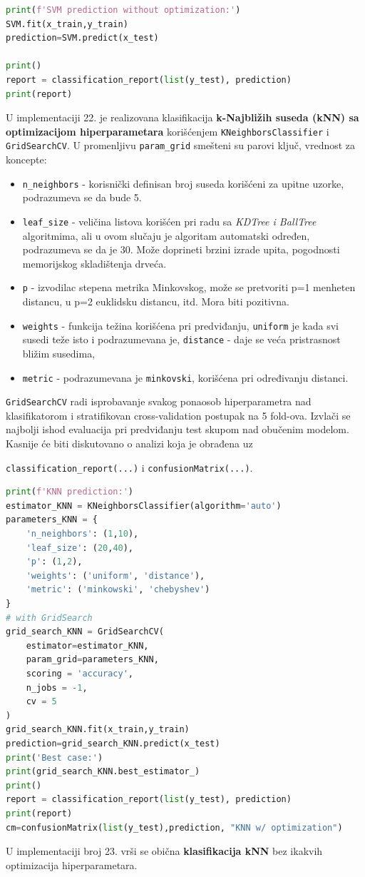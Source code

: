 \documentclass[fontsize=12bp, paper=a4]{scrarticle}
\begin{document}
\begin{lstlisting}[language=Python, caption=SVM bez ikakvih optimizacija hiperparametara.]
print(f'SVM prediction without optimization:')
SVM.fit(x_train,y_train)
prediction=SVM.predict(x_test)

print()
report = classification_report(list(y_test), prediction)
print(report)
\end{lstlisting}
U implementaciji 22. je realizovana klasifikacija \textbf{k-Najbližih suseda (kNN) sa optimizacijom hiperparametara} korišćenjem \verb|KNeighborsClassifier|\cite{kNN} i \verb|GridSearchCV|. U promenljivu \verb|param_grid| smešteni su parovi ključ, vrednost za koncepte:
\begin{itemize}
    \item \verb|n_neighbors| - korisnički definisan broj suseda korišćeni za upitne uzorke, podrazumeva se da bude 5.
    \item \verb|leaf_size| - veličina listova korišćen pri radu sa \textit{KDTree i BallTree} algoritmima, ali u ovom slučaju je algoritam automatski određen, podrazumeva se da je 30. Može doprineti brzini izrade upita, pogodnosti memorijskog skladištenja drveća.
    \item \verb|p| - izvodilac stepena metrika Minkovskog, može se pretvoriti p=1 menheten distancu, u p=2 euklidsku distancu, itd. Mora biti pozitivna.
    \item \verb|weights| - funkcija težina korišćena pri predviđanju, \verb|uniform| je kada svi susedi teže isto i podrazumevana je, \verb|distance| - daje se veća pristrasnost bližim susedima,
    \item \verb|metric| - podrazumevana je \verb|minkovski|, korišćena pri određivanju distanci.
\end{itemize} 
\verb*|GridSearchCV| radi isprobavanje svakog ponaosob hiperparametra nad klasifikatorom i stratifikovan cross-validation postupak na 5 fold-ova. Izvlači se najbolji ishod evaluacija pri predviđanju test skupom nad obučenim modelom. Kasnije će biti diskutovano o analizi koja je obrađena uz 

\verb|classification_report(...)| i \verb|confusionMatrix(...)|.
\begin{lstlisting}[language=Python, caption=kNN sa optimizacijama hiperparametara.]
print(f'KNN prediction:')
estimator_KNN = KNeighborsClassifier(algorithm='auto')
parameters_KNN = {
    'n_neighbors': (1,10),
    'leaf_size': (20,40),
    'p': (1,2),
    'weights': ('uniform', 'distance'),
    'metric': ('minkowski', 'chebyshev')	   
} 
# with GridSearch
grid_search_KNN = GridSearchCV(
    estimator=estimator_KNN,
    param_grid=parameters_KNN,
    scoring = 'accuracy',
    n_jobs = -1,
    cv = 5
)
grid_search_KNN.fit(x_train,y_train)
prediction=grid_search_KNN.predict(x_test)
print('Best case:')
print(grid_search_KNN.best_estimator_)
print()
report = classification_report(list(y_test), prediction)
print(report)
cm=confusionMatrix(list(y_test),prediction, "KNN w/ optimization")

\end{lstlisting}
U implementaciji broj 23. vrši se obična \textbf{klasifikacija kNN} bez ikakvih optimizacija hiperparametara.
\end{document}
